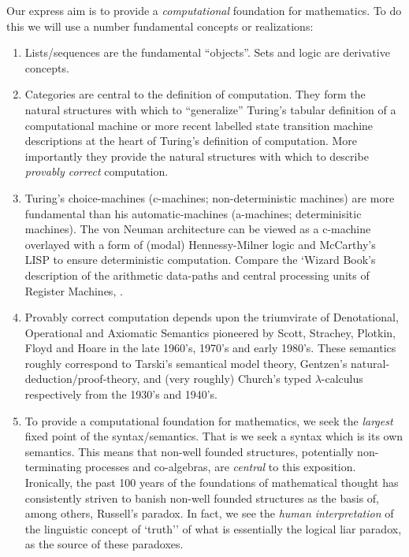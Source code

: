 
Our express aim is to provide a \emph{computational} foundation for mathematics.
To do this we will use a number fundamental concepts or realizations:
\begin{enumerate}
\item	Lists/sequences are the fundamental ``objects''. Sets and logic are
derivative concepts.

\item	Categories are central to the definition of computation. They form the
natural structures with which to ``generalize'' Turing's tabular definition of a
computational machine or more recent labelled state transition machine
descriptions at the heart of Turing's definition of computation. More
importantly they provide the natural structures with which to describe
\emph{provably correct} computation.

\item	Turing's choice-machines (c-machines; non-deterministic machines) are more
fundamental than his automatic-machines (a-machines; determinisitic machines).
The von Neuman architecture can be viewed as a c-machine overlayed with a form
of (modal) Hennessy-Milner logic and McCarthy's LISP to ensure deterministic
computation. Compare the `Wizard Book's description of the arithmetic data-paths
and central processing units of Register Machines, \cite[Chapter
5]{abelsonSussmanSussman1996structureInterpretationComputerPrograms}.

\item	Provably correct computation depends upon the triumvirate of Denotational,
Operational and Axiomatic Semantics pioneered by Scott, Strachey, Plotkin, Floyd
and Hoare in the late 1960's, 1970's and early 1980's. These semantics roughly
correspond to Tarski's semantical model theory, Gentzen's
natural-deduction/proof-theory, and (very roughly) Church's typed
$\lambda$-calculus respectively from the 1930's and 1940's.

\item	To provide a computational foundation for mathematics, we seek the
\emph{largest} fixed point of the syntax/semantics.  That is we seek a syntax
which is its own semantics. This means that non-well founded structures,
potentially non-terminating processes and co-algebras, are \emph{central} to
this exposition. Ironically, the past 100 years of the foundations of
mathematical thought has consistently striven to banish non-well founded
structures as the basis of, among others, Russell's paradox. In fact, we see the
\emph{human interpretation} of the linguistic concept of `truth'' of what is
essentially the logical liar paradox, as the source of these paradoxes.


\end{enumerate}
